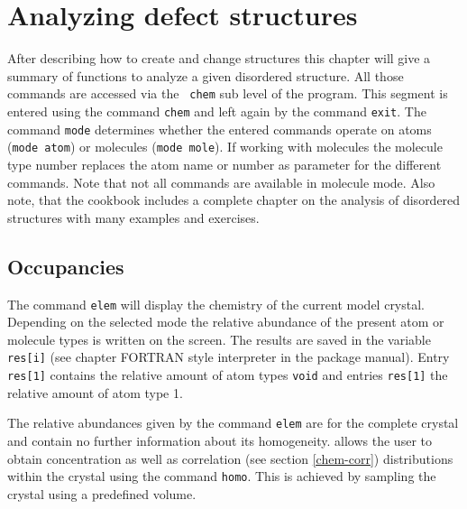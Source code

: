 
\chapter{Analyzing defect structures \label{chem}}

After describing how to create and change structures this chapter
will give a summary of \Discus functions to analyze a given
disordered structure. All those commands are accessed via the {\tt
chem} sub level of the program. This segment is entered using the
command {\tt chem} and left again by the command {\tt exit}. The
command {\tt mode} determines whether the entered commands operate
on atoms ({\tt mode atom}) or molecules ({\tt mode mole}). If
working with molecules the molecule type number replaces the atom
name or number as parameter for the different commands. Note that
not all commands are available in molecule mode. Also note, that the
\Discus cookbook \citep{nedpro} includes a complete chapter on
the analysis of disordered structures with many examples and
exercises.


\section{Occupancies \label{chem-occ}}

The command {\tt elem} will display the chemistry of the current
model crystal. Depending on the selected mode the relative abundance
of the present atom or molecule types is written on the screen. The
results are saved in the variable {\tt res[i]} (see chapter
FORTRAN style interpreter in the package manual). Entry {\tt res[1]}
contains the relative amount of atom types {\tt void} and entries 
{\tt res[1]} the relative amount of atom type 1.

The relative abundances given by the command
{\tt elem} are for the complete crystal and contain no further
information about its homogeneity. \Discus allows the user to
obtain concentration as well as correlation (see section
\ref{chem-corr}) distributions within the crystal using the command
{\tt homo}. This is achieved by sampling the crystal using a
predefined volume.


